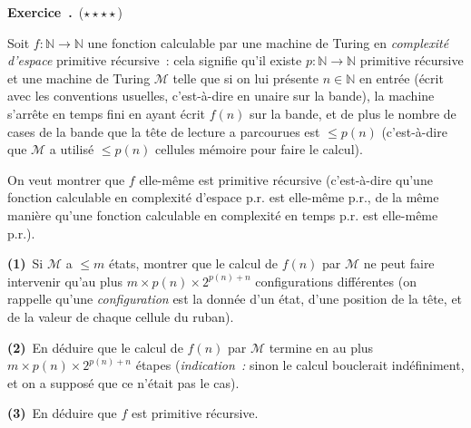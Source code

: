 \documentclass[12pt,a4paper]{article}
\theoremstyle{definition}
\newcommand\exercice{%
\refstepcounter{comcnt}\bigskip\noindent\textbf{Exercice~\thecomcnt.}}
\begin{document}
%

\exercice\ (${\star}{\star}{\star}{\star}$)\par\nobreak

Soit $f \colon\mathbb{N} \to \mathbb{N}$ une fonction calculable par
une machine de Turing en \emph{complexité d'espace} primitive
récursive : cela signifie qu'il existe $p \colon\mathbb{N} \to
\mathbb{N}$ primitive récursive et une machine de Turing $\mathscr{M}$
telle que si on lui présente $n \in \mathbb{N}$ en entrée (écrit avec
les conventions usuelles, c'est-à-dire en unaire sur la bande), la
machine s'arrête en temps fini en ayant écrit $f(n)$ sur la bande, et
de plus le nombre de cases de la bande que la tête de lecture a
parcourues est $\leq p(n)$ (c'est-à-dire que $\mathscr{M}$ a utilisé
$\leq p(n)$ cellules mémoire pour faire le calcul).

On veut montrer que $f$ elle-même est primitive récursive
(c'est-à-dire qu'une fonction calculable en complexité d'espace
p.r. est elle-même p.r., de la même manière qu'une fonction calculable
en complexité en temps p.r. est elle-même p.r.).

\textbf{(1)} Si $\mathscr{M}$ a $\leq m$ états, montrer que le calcul
de $f(n)$ par $\mathscr{M}$ ne peut faire intervenir qu'au plus
$m\times p(n)\times 2^{p(n)+n}$ configurations différentes (on rappelle
qu'une \emph{configuration} est la donnée d'un état, d'une position de
la tête, et de la valeur de chaque cellule du ruban).

\textbf{(2)} En déduire que le calcul de $f(n)$ par $\mathscr{M}$
termine en au plus $m\times p(n)\times 2^{p(n)+n}$ étapes
(\textit{indication :} sinon le calcul bouclerait indéfiniment, et on
a supposé que ce n'était pas le cas).

\textbf{(3)} En déduire que $f$ est primitive récursive.
\end{document}
